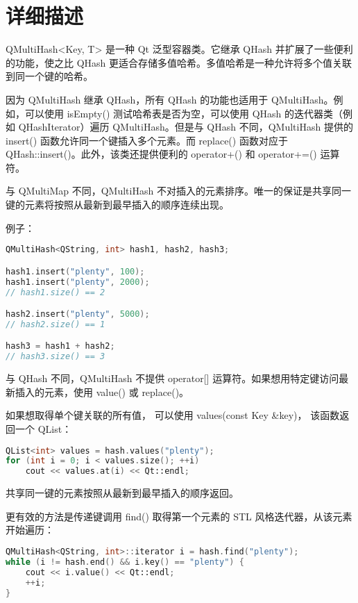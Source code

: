 \section{详细描述}

QMultiHash<Key, T> 是一种 Qt 泛型容器类。它继承 QHash 并扩展了一些便利的功能，使之比 QHash 更适合存储多值哈希。多值哈希是一种允许将多个值关联到同一个键的哈希。

因为 QMultiHash 继承 QHash，所有 QHash 的功能也适用于 QMultiHash。例如，可以使用 isEmpty() 测试哈希表是否为空，可以使用 QHash 的迭代器类（例如 QHashIterator）遍历 QMultiHash。但是与 QHash 不同，QMultiHash 提供的 insert() 函数允许同一个键插入多个元素。而 replace() 函数对应于 QHash::insert()。此外，该类还提供便利的 operator+() 和 operator+=() 运算符。

与 QMultiMap 不同，QMultiHash 不对插入的元素排序。唯一的保证是共享同一键的元素将按照从最新到最早插入的顺序连续出现。

例子：

\begin{lstlisting}[language=C++]
QMultiHash<QString, int> hash1, hash2, hash3;

hash1.insert("plenty", 100);
hash1.insert("plenty", 2000);
// hash1.size() == 2

hash2.insert("plenty", 5000);
// hash2.size() == 1

hash3 = hash1 + hash2;
// hash3.size() == 3
\end{lstlisting}


与 QHash 不同，QMultiHash 不提供 operator[] 运算符。如果想用特定键访问最新插入的元素，使用 value() 或 replace()。

如果想取得单个键关联的所有值，
可以使用 values(const Key \&key)，
该函数返回一个 QList：

\begin{lstlisting}[language=C++]
QList<int> values = hash.values("plenty");
for (int i = 0; i < values.size(); ++i)
    cout << values.at(i) << Qt::endl;
\end{lstlisting}

共享同一键的元素按照从最新到最早插入的顺序返回。

更有效的方法是传递键调用 find() 取得第一个元素的 STL 风格迭代器，从该元素开始遍历：

\begin{lstlisting}[language=C++]
QMultiHash<QString, int>::iterator i = hash.find("plenty");
while (i != hash.end() && i.key() == "plenty") {
    cout << i.value() << Qt::endl;
    ++i;
}
\end{lstlisting}

